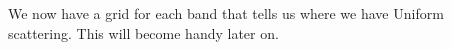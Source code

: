 We now have a grid for each band that tells us where we have Uniform scattering. This will become handy later on. 



